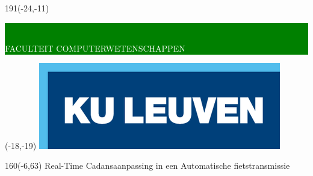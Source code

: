 \documentclass[12pt,a4paper,oneside]{book}
\begin{document}
\thispagestyle{empty}
\newcommand{\form}[1]{\scalebox{1.087}{\boldmath{#1}}}
\sffamily
%
\begin{textblock}{191}(-24,-11)
\colorbox{green}{\hspace{113mm}\ \parbox[c][18truemm]{100mm}{\textcolor{white}{FACULTEIT COMPUTERWETENSCHAPPEN}}}
\end{textblock}
%
\begin{textblock}{70}(-18,-19)
\textblockcolour{}
\includegraphics*[height=19.8truemm]{LogoKULeuven}
\end{textblock}
%
\begin{textblock}{160}(-6,63)
\textblockcolour{}
\vspace{-\parskip}
\flushleft
\fontsize{40}{42}\selectfont \textcolor{bluetitle}{Real-Time Cadansaanpassing in een Automatische fietstransmissie }\\[1.5mm]
\end{textblock}
%
\end{document}
